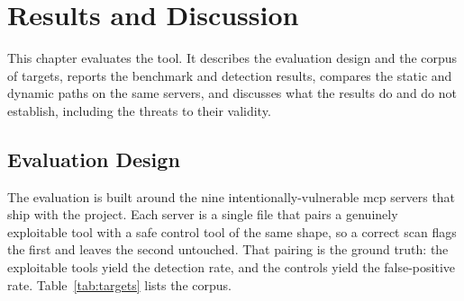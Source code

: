 \chapter{Results and Discussion}
\label{chap:results}


This chapter evaluates the tool. It describes the evaluation design and the corpus of targets, reports the benchmark and detection results, compares the static and dynamic paths on the same servers, and discusses what the results do and do not establish, including the threats to their validity.

\section{Evaluation Design}
\label{sec:eval-design}


The evaluation is built around the nine intentionally-vulnerable \gls{mcp} servers that ship with the project. Each server is a single file that pairs a genuinely exploitable tool with a safe control tool of the same shape, so a correct scan flags the first and leaves the second untouched. That pairing is the ground truth: the exploitable tools yield the detection rate, and the controls yield the false-positive rate. Table~\ref{tab:targets} lists the corpus.


